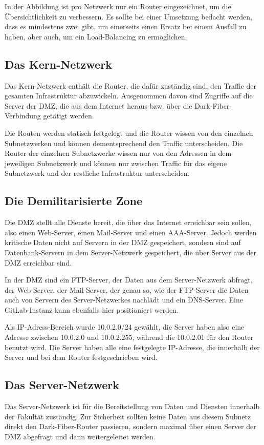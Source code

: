 In der Abbildung ist pro Netzwerk nur ein Router eingezeichnet, um die Übersichtlichkeit zu verbessern. Es sollte bei einer Umsetzung bedacht werden, dass es mindestens zwei gibt, um einerseits einen Ersatz bei einem Ausfall zu haben, aber auch, um  ein Load-Balancing zu ermöglichen.

\subsection{Das Kern-Netzwerk}
Das Kern-Netzwerk enthält die Router, die dafür zuständig sind, den Traffic der gesamten Infrastruktur abzuwickeln. Ausgenommen davon sind Zugriffe auf die Server der DMZ, die aus dem Internet heraus bzw. über die Dark-Fiber-Verbindung getätigt werden.

Die Routen werden statisch festgelegt und die Router wissen von den einzelnen Subnetzwerken und können dementsprechend den Traffic unterscheiden. Die Router der einzelnen Subnetzwerke wissen nur von den Adressen in dem jeweiligen Subnetzwerk und können nur zwischen Traffic für das eigene Subnetzwerk und der restliche Infrastruktur unterscheiden.

\subsection{Die Demilitarisierte Zone}
Die DMZ stellt alle Dienste bereit, die über das Internet erreichbar sein sollen, also einen Web-Server, einen Mail-Server und einen AAA-Server. Jedoch werden kritische Daten nicht auf Servern in der DMZ gespeichert, sondern sind auf Datenbank-Servern in dem Server-Netzwerk gespeichert, die über Server aus der DMZ erreichbar sind.

In der DMZ sind ein FTP-Server, der Daten aus dem Server-Netzwerk abfragt, der Web-Server, der Mail-Server, der genau so, wie der FTP-Server die Daten auch von Servern des Server-Netzwerkes nachlädt und ein DNS-Server. Eine GitLab-Instanz kann ebenfalls hier positioniert werden.

Als IP-Adress-Bereich wurde 10.0.2.0/24 gewählt, die Server haben also eine Adresse zwischen 10.0.2.0 und 10.0.2.255, während die 10.0.2.01 für den Router benutzt wird. Die Server haben alle eine festgelegte IP-Adresse, die innerhalb der Server und bei dem Router festgeschrieben wird.


\subsection{Das Server-Netzwerk}
Das Server-Netzwerk ist für die Bereitstellung von Daten und Diensten innerhalb der Fakultät zuständig. Zur Sicherheit sollten keine Daten aus diesem Subnetz direkt den Dark-Fiber-Router passieren, sondern maximal über einen Server der DMZ abgefragt und dann weitergeleitet werden.

